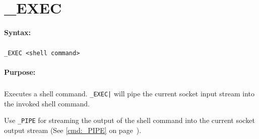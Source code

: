 
\newpage
\section{\_EXEC}
\label{cmd:_EXEC}

\paragraph{Syntax:}
\subparagraph{}
\texttt{\_EXEC <shell command>}

\paragraph{Purpose:}
\subparagraph{}
Executes a shell command. \texttt{\_EXEC|} will pipe the 
current socket input stream into the invoked shell command.

Use \texttt{\_PIPE} for streaming the output of the shell 
command into the current socket output stream (See \autoref{cmd:_PIPE} 
on page~\pageref{cmd:_PIPE}). 